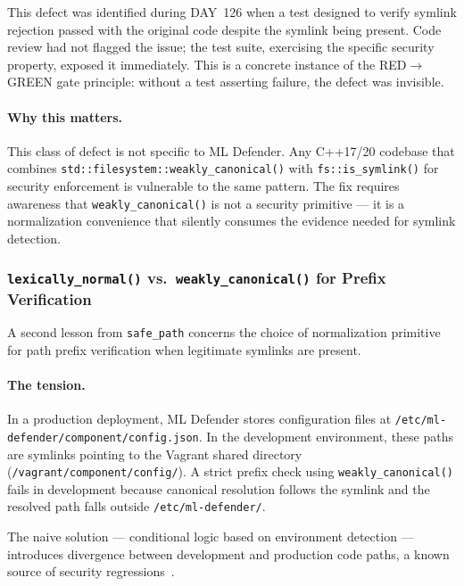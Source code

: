 \documentclass[11pt,a4paper]{article}
\begin{document}
    This defect was identified during DAY~126 when a test designed to verify symlink rejection
    passed with the original code despite the symlink being present. Code review had not flagged
    the issue; the test suite, exercising the specific security property, exposed it immediately.
    This is a concrete instance of the RED$\to$GREEN gate principle: without a test asserting
    failure, the defect was invisible.

    \paragraph{Why this matters.}
    This class of defect is not specific to ML Defender. Any C++17/20 codebase that combines
    \texttt{std::filesystem::weakly\_canonical()} with \texttt{fs::is\_symlink()} for security
    enforcement is vulnerable to the same pattern. The fix requires awareness that
    \texttt{weakly\_canonical()} is not a security primitive --- it is a normalization
    convenience that silently consumes the evidence needed for symlink detection.

    \subsubsection{\texttt{lexically\_normal()} vs.\ \texttt{weakly\_canonical()} for Prefix Verification}
    \label{subsubsec:lexical-vs-canonical}

    A second lesson from \texttt{safe\_path} concerns the choice of normalization primitive
    for path prefix verification when legitimate symlinks are present.

    \paragraph{The tension.}
    In a production deployment, ML Defender stores configuration files at
    \texttt{/etc/ml-defender/component/config.json}. In the development environment,
    these paths are symlinks pointing to the Vagrant shared directory
    (\texttt{/vagrant/component/config/}). A strict prefix check using
    \texttt{weakly\_canonical()} fails in development because canonical resolution
    follows the symlink and the resolved path falls outside
    \texttt{/etc/ml-defender/}.

    The naive solution --- conditional logic based on environment detection --- introduces
    divergence between development and production code paths, a known source of
    security regressions~\cite{cwe22}.
\end{document}
